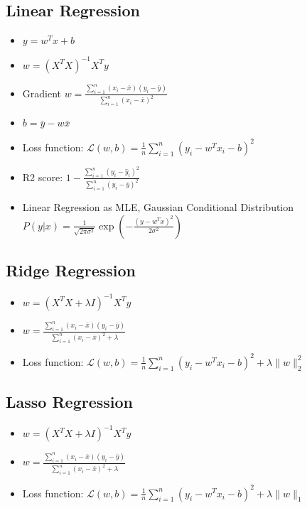 \documentclass[a4paper,7pt]{extarticle}
\theoremstyle{definition}
\begin{document}
\begin{multicols*}{2}
\subsection{Linear Regression}

\begin{itemize}
\item $y = w^T x + b$
\item $w = (X^T X)^{-1} X^T y$
\item Gradient $w = \frac{\sum_{i=1}^n (x_i - \bar{x}) (y_i - \bar{y})}{\sum_{i=1}^n (x_i - \bar{x})^2}$
\item $b = \bar{y} - w \bar{x}$
\item Loss function: $\mathcal{L}(w, b) = \frac{1}{n} \sum_{i=1}^n (y_i - w^T x_i - b)^2$
\item R2 score: $1 - \frac{\sum_{i=1}^n (y_i - \hat{y}_i)^2}{\sum_{i=1}^n (y_i - \bar{y})^2}$
\item Linear Regression as MLE, Gaussian Conditional Distribution $P(y|x) = \frac{1}{\sqrt{2 \pi \sigma^2}} \exp \left( - \frac{(y - w^T x)^2}{2 \sigma^2} \right)$
\end{itemize}

\subsection{Ridge Regression}

\begin{itemize}
\item $w = (X^T X + \lambda I)^{-1} X^T y$
\item $w = \frac{\sum_{i=1}^n (x_i - \bar{x}) (y_i - \bar{y})}{\sum_{i=1}^n (x_i - \bar{x})^2 + \lambda}$
\item Loss function: $\mathcal{L}(w, b) = \frac{1}{n} \sum_{i=1}^n (y_i - w^T x_i - b)^2 + \lambda \|w\|_2^2$
\end{itemize}

\subsection{Lasso Regression}

\begin{itemize}
\item $w = (X^T X + \lambda I)^{-1} X^T y$
\item $w = \frac{\sum_{i=1}^n (x_i - \bar{x}) (y_i - \bar{y})}{\sum_{i=1}^n (x_i - \bar{x})^2 + \lambda}$
\item Loss function: $\mathcal{L}(w, b) = \frac{1}{n} \sum_{i=1}^n (y_i - w^T x_i - b)^2 + \lambda \|w\|_1$
\end{itemize}


\end{multicols*}
\end{document}
